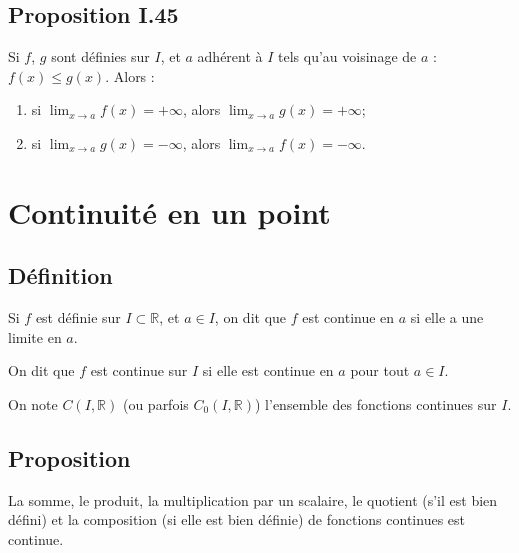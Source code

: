 \documentclass{article}
\begin{document}
	\subsection{Proposition I.45}
	Si \( f \), \( g \) sont définies sur \( I \), et \( a \) adhérent à \( I \) tels qu'au voisinage de \( a \) : \( f(x) \leq g(x) \). Alors :
	\begin{enumerate}
		\item si \( \lim_{x \to a} f(x) = +\infty \), alors \( \lim_{x \to a} g(x) = +\infty \);
		\item si \( \lim_{x \to a} g(x) = -\infty \), alors \( \lim_{x \to a} f(x) = -\infty \).
	\end{enumerate}
	

	\section{ Continuité en un point}
		\subsection{Définition } Si \( f \) est définie sur \( I \subset \mathbb{R} \), et \( a \in I \), on dit que \( f \) est continue en \( a \) si elle a une limite en \( a \).
	
	On dit que \( f \) est continue sur \( I \) si elle est continue en \( a \) pour tout \( a \in I \).
	
	On note \( C(I,\mathbb{R}) \) (ou parfois \( C_0(I,\mathbb{R}) \)) l’ensemble des fonctions continues sur \( I \).
	
		\subsection{Proposition} La somme, le produit, la multiplication par un scalaire, le quotient (s’il est bien défini) et la composition (si elle est bien définie) de fonctions continues est continue.
	

	


	
	
	

	
\end{document}
